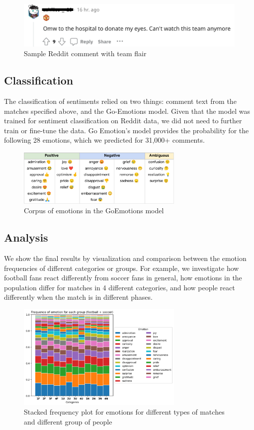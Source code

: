 \documentclass{article}
\begin{document}
\begin{figure}[h]
    \includegraphics[width=\linewidth]{Comment.png}
    \caption{Sample Reddit comment with team flair}
\end{figure}


\subsection{Classification}
The classification of sentiments relied on two things: comment text from the matches specified above, and the Go-Emotions model. Given that the model was trained for sentiment classification on Reddit data, we did not need to further train or fine-tune the data. Go Emotion's model provides the probability for the following 28 emotions, which we predicted for 31,000+ comments.
\begin{figure}[h]
    \includegraphics[width=8cm]{GoEmotions.png}
    \caption{Corpus of emotions in the GoEmotions model}
\end{figure}

\subsection{Analysis}
We show the final results by visualization and comparison between the emotion frequencies of different categories or groups. For example, we investigate how football fans react differently from soccer fans in general, how emotions in the population differ for matches in 4 different categories, and how people react differently when the match is in different phases.

\begin{figure}[h]
    \includegraphics[width=8cm]{StackedFrequency.png}
    \caption{Stacked frequency plot for emotions for different types of matches and different group of people}
\end{figure}
\end{document}
